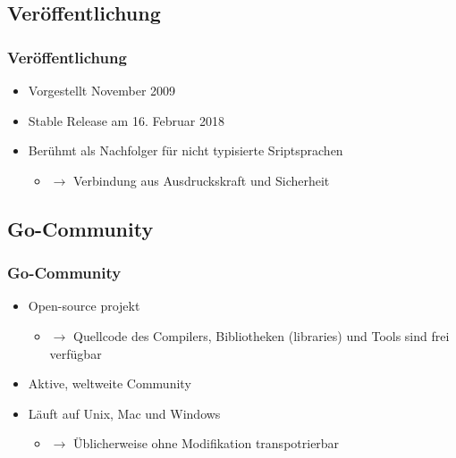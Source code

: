 \documentclass{beamer}
\begin{document}
\subsection{Ver\"offentlichung}
\begin{frame}
\frametitle{Ver\"offentlichung}

\begin{itemize}
\setlength{\itemsep}{40pt}
\item Vorgestellt November 2009
\item Stable Release am 16. Februar 2018
\item Ber\"uhmt als Nachfolger für nicht typisierte Sriptsprachen
\begin{itemize}
\item[] $\rightarrow$ Verbindung aus Ausdruckskraft und Sicherheit
\end{itemize}
\end{itemize}

\end{frame}


\subsection{Go-Community}
\begin{frame}
\frametitle{Go-Community}

\begin{itemize}
\setlength{\itemsep}{44pt}
\item Open-source projekt
\begin{itemize}
\item[] $\rightarrow$ Quellcode des Compilers, Bibliotheken (libraries) und Tools sind frei verfügbar
\end{itemize}
\item Aktive, weltweite Community
\item L\"auft auf Unix, Mac und Windows
\begin{itemize}
\item[] $\rightarrow$ \"Ublicherweise ohne Modifikation transpotrierbar
\end{itemize}
\end{itemize}

\end{frame}
\end{document}
